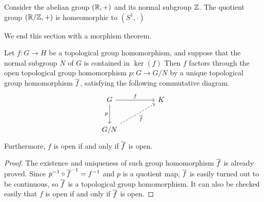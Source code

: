 \begin{exmp}
    Consider the abelian group $({\mathbb{R}}, +)$ and its normal subgroup ${\mathbb{Z}}$.
    The quotient group $({\mathbb{R}}/{\mathbb{Z}}, +)$ is homeomorphic to $(S^1, \cdot)$
\end{exmp}

We end this section with a morphism theorem.
\begin{thm}
    Let $f: G\rightarrow H$ be a topological group homomorphism, and suppose that the normal subgroup $N$ of $G$ is contained in $\ker(f)$
    Then $f$ factors through the open topological group homomorphism $p: G\rightarrow G/N$ by a unique topological group homomorphism $\overline{f}$, satisfying the following commutative diagram.
    \begin{equation*}
    \begin{tikzcd}[row sep=large, column sep=huge]
        G
        \arrow[r, "f"]
        \arrow[d, "p"']
        &
        K\\
        G/N
        \arrow[ur, "\ol f"', dashed]
    \end{tikzcd}
    \end{equation*}
    Furthermore, $f$ is open if and only if $\overline{f}$ is open.
\end{thm}
\begin{proof}
    The existence and uniqueness of such group homomorphism $\overline{f}$ is already proved.
    Since $p^{-1}\circ\overline{f}^{-1}=f^{-1}$ and $p$ is a quotient map, $\overline{f}$ is easily turned out to be continuous, so $\overline{f}$ is a topological group homomorphism.
    It can also be checked easily that $f$ is open if and only if $\overline{f}$ is open.
\end{proof}